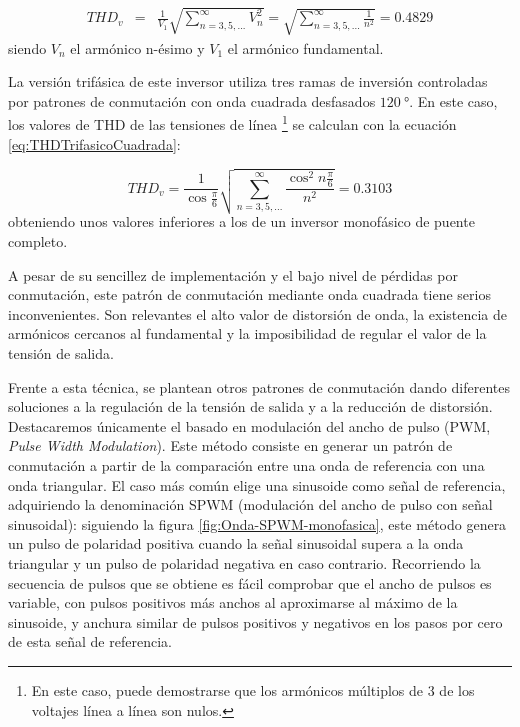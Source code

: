 \begin{eqnarray}
THD_{v} & = & \frac{1}{V_{1}}\sqrt{\sum_{n=3,5,...}^{\infty}V_{n}^{2}}=\sqrt{\sum_{n=3,5,...}^{\infty}\frac{1}{n^{2}}}=0.4829\label{eq:THDOndaCuadrada}\end{eqnarray}
siendo $V_{n}$ el armónico n-ésimo y $V_{1}$ el armónico fundamental. 

La versión trifásica de este inversor utiliza tres ramas de inversión
controladas por patrones de conmutación con onda cuadrada desfasados
$\SI{120}{\degree}$. En este caso, los valores de THD de las tensiones
de línea%
\footnote{En este caso, puede demostrarse que los armónicos múltiplos de 3 de
los voltajes línea a línea son nulos.%
} se calculan con la ecuación \ref{eq:THDTrifasicoCuadrada}:

\begin{equation}
THD_{v}=\frac{1}{\cos\frac{\pi}{6}}\sqrt{\sum_{n=3,5,...}^{\infty}\frac{\cos^{2}n\frac{\pi}{6}}{n^{2}}}=0.3103\label{eq:THDTrifasicoCuadrada}\end{equation}
obteniendo unos valores inferiores a los de un inversor monofásico
de puente completo.

A pesar de su sencillez de implementación y el bajo nivel de pérdidas
por conmutación, este patrón de conmutación mediante onda cuadrada
tiene serios inconvenientes. Son relevantes el alto valor de distorsión
de onda, la existencia de armónicos cercanos al fundamental y la imposibilidad
de regular el valor de la tensión de salida.

Frente a esta técnica, se plantean otros patrones de conmutación dando
diferentes soluciones a la regulación de la tensión de salida y a
la reducción de distorsión. Destacaremos únicamente el basado en modulación
del ancho de pulso (PWM, \emph{Pulse Width Modulation}). Este método
consiste en generar un patrón de conmutación a partir de la comparación
entre una onda de referencia con una onda triangular. El caso más
común elige una sinusoide como señal de referencia, adquiriendo la
denominación SPWM (modulación del ancho de pulso con señal
sinusoidal): siguiendo la figura \ref{fig:Onda-SPWM-monofasica}, este
método genera un pulso de polaridad positiva cuando la señal
sinusoidal supera a la onda triangular y un pulso de polaridad
negativa en caso contrario. Recorriendo la secuencia de pulsos que se
obtiene es fácil comprobar que el ancho de pulsos es variable, con
pulsos positivos más anchos al aproximarse al máximo de la sinusoide,
y anchura similar de pulsos positivos y negativos en los pasos por
cero de esta señal de referencia.

